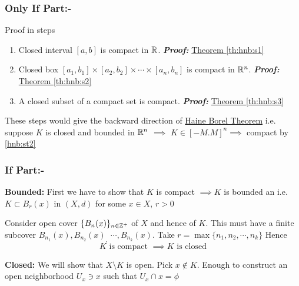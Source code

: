 \begin{myproof}
	\subsubsection{Only If Part:-}
	Proof in steps
	\begin{enumerate}[label=\bfseries\tiny\protect\circled{\small\arabic*}]
		\item \label{hnb:st1}Closed interval $[a,b]$ is compact in $\mathbb{R}$. \textbf{\textit{Proof:}} \hyperref[th:hnb:s1]{Theorem \ref{th:hnb:s1}}
		\item \label{hnb:st2}Closed box $[a_1,b_1]\times [a_2,b_2]\times\cdots\times
		[a_n,b_n]$ is compact in $\mathbb{R}^n$. \textbf{\textit{Proof:}} \hyperref[th:hnb:s2]{Theorem \ref{th:hnb:s2}}
		\item \label{hnb:st3}A closed subset of a compact set is compact. \textbf{\textit{Proof:}} \hyperref[th:hnb:s3]{Theorem \ref{th:hnb:s3}}
	\end{enumerate}
	These steps would give the backward direction of \hyperref[th:hnb]{Haine Borel	Theorem} i.e. suppose $K$ is closed and bounded in $\mathbb{R}^n$ $\implies$ $K\in [-M.M]^n\implies $ compact by \ref{hnb:st2}
	
	\subsubsection{If Part:-}
	\textbf{Bounded:} First we have to show that $K$ is compact $\implies K$ is	bounded an i.e. $K\subset B_r(x)$ in $(X,d)$ for some $x\in X$, $r>0$
	
	Consider open cover $\{B_n(x)\}_{n\in\mathbb{Z}^+}$ of $X$ and hence of $K$. This must 	have a finite subcover $B_{n_1}(x),B_{n_2}(x)_,$ $\cdots ,B_{n_k}(x)$. Take $r=\max\{n_1,n_2,\cdots,n_k\}$ Hence $$K\text{ is compact }\implies K\text{ is
		closed}$$
	
	\parinf\textbf{Closed: }\parinn We will show that $X\setminus K$ is open. Pick $x\notin K$. Enough to construct an open neighborhood $U_x\ni x$ such that $U_x\cap x=\phi$
	

\end{myproof}
